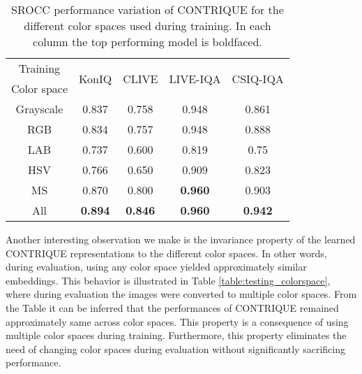 \documentclass[journal]{IEEEtran}
\begin{document}
\begin{table}[t]
    \caption{SROCC performance variation of CONTRIQUE for the different color spaces used during training. In each column the top performing model is boldfaced.}
    \label{table:training_colorspace}
    \centering
    \footnotesize
        \begin{tabular}{|c||c|c|c|c|}
        \hline
        Training & \multirow{2}{*}{KonIQ} & \multirow{2}{*}{CLIVE} & \multirow{2}{*}{LIVE-IQA} & \multirow{2}{*}{CSIQ-IQA} \\
        Color space & ~ & ~ & ~ & ~ \\ \hline \hline
        Grayscale & 0.837 & 0.758 & 0.948 & 0.861 \\
        RGB & 0.834 & 0.757 & 0.948 & 0.888 \\
        LAB & 0.737 & 0.600 & 0.819 & 0.75 \\
        HSV & 0.766 & 0.650 & 0.909 & 0.823 \\
        MS & 0.870 & 0.800 & \textbf{0.960} & 0.903 \\ \hline
        All & \textbf{0.894} & \textbf{0.846} & \textbf{0.960} & \textbf{0.942} \\
        \hline
    \end{tabular}
\end{table}

Another interesting observation we make is the invariance property of the learned CONTRIQUE representations to the different color spaces. In other words, during evaluation, using any color space yielded approximately similar embeddings. This behavior is illustrated in Table \ref{table:testing_colorspace}, where during evaluation the images were converted to multiple color spaces. From the Table it can be inferred that the performances of CONTRIQUE remained approximately same across color spaces. This property is a consequence of using multiple color spaces during training. Furthermore, this property eliminates the need of changing color spaces during evaluation without significantly sacrificing performance.
\end{document}
